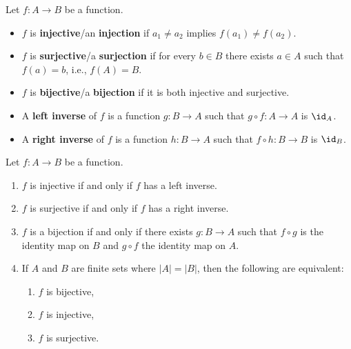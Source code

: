  Let $f : A \to B$ be a function.
\begin{itemize}
    \item $f$ is \textbf{injective}/an \textbf{injection} if $a_1 \neq a_2$ implies $f(a_1) \neq f(a_2)$.
    \item $f$ is \textbf{surjective}/a \textbf{surjection} if for every $b \in B$ there exists $a \in A$ such that $f(a) = b$, i.e., $f(A) = B$.
    \item $f$ is \textbf{bijective}/a \textbf{bijection} if it is both injective and surjective.
    \item A \textbf{left inverse} of $f$ is a function $g : B \to A$ such that $g \circ f : A \to A$ is $\id_A$.
    \item A \textbf{right inverse} of $f$ is a function $h : B \to A$ such that $f \circ h : B \to B$ is $\id_B$.
\end{itemize}

 \label{prop0.1}
Let $f: A \to B$ be a function.
\begin{enumerate}
    \item $f$ is injective if and only if $f$ has a left inverse.
    \item $f$ is surjective if and only if $f$ has a right inverse.
    \item $f$ is a bijection if and only if there exists $g: B \to A$ such that $f \circ g$ is the identity map on $B$ and $g \circ f$ the identity map on $A$.
    \item If $A$ and $B$ are finite sets where $|A| = |B|$, then the following are equivalent:
    \begin{enumerate}
        \item $f$ is bijective,
        \item $f$ is injective,
        \item $f$ is surjective.
    \end{enumerate}
\end{enumerate}

